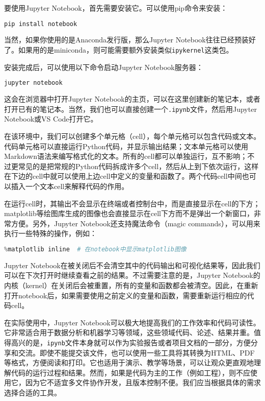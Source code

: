 \documentclass[../main.tex]{subfiles}
\begin{document}
要使用Jupyter Notebook，首先需要安装它。可以使用pip命令来安装：
\begin{lstlisting}[language=bash]
pip install notebook
\end{lstlisting}
当然，如果你使用的是Anaconda发行版，那么Jupyter Notebook往往已经预装好了。如果用的是miniconda，则可能需要额外安装类似\texttt{ipykernel}这类包。

安装完成后，可以使用以下命令启动Jupyter Notebook服务器：
\begin{lstlisting}[language=bash]
jupyter notebook
\end{lstlisting}
这会在浏览器中打开Jupyter Notebook的主页，可以在这里创建新的笔记本，或者打开已有的笔记本。当然，我们也可以直接创建一个\texttt{.ipynb}文件，然后用Jupyter Notebook或VS Code打开它。

在该环境中，我们可以创建多个单元格（cell），每个单元格可以包含代码或文本。代码单元格可以直接运行Python代码，并显示输出结果；文本单元格可以使用Markdown语法来编写格式化的文本。所有的cell都可以单独运行，互不影响；不过更常见的是把常规的Python代码拆成许多个cell，然后从上到下依次运行，这样在下边的cell中就可以使用上边cell中定义的变量和函数了。两个代码cell中间也可以插入一个文本cell来解释代码的作用。

在运行cell时，其输出不会显示在终端或者控制台中，而是直接显示在cell的下方；matplotlib等绘图库生成的图像也会直接显示在cell下方而不是弹出一个新窗口，非常方便。另外，Jupyter Notebook还支持魔法命令（magic commands），可以用来执行一些特殊的操作，例如：
\begin{lstlisting}[language=python]
%timeit sum(range(1000))  # 计算代码运行时间
%matplotlib inline  # 在notebook中显示matplotlib图像
\end{lstlisting}

Jupyter Notebook在被关闭后不会清空其中的代码输出和可视化结果等，因此我们可以在下次打开时继续查看之前的结果。不过需要注意的是，Jupyter Notebook的内核（kernel）在关闭后会被重置，所有的变量和函数都会被清空。因此，在重新打开notebook后，如果需要使用之前定义的变量和函数，需要重新运行相应的代码cell。

在实际使用中，Jupyter Notebook可以极大地提高我们的工作效率和代码可读性。它非常适合用于数据分析和机器学习等领域，这些领域代码、论述、结果并重。值得高兴的是，\texttt{ipynb}文件本身就可以作为实验报告或者项目文档的一部分，方便分享和交流。即使不能提交该文件，也可以使用一些工具将其转换为HTML、PDF等格式，方便阅读和打印。它也适用于演示、教学等场景，可以让观众更直观地理解代码的运行过程和结果。然而，如果是代码为主的工作（例如工程），则不应使用它，因为它不适宜多文件协作开发，且版本控制不便。我们应当根据具体的需求选择合适的工具。
\end{document}
